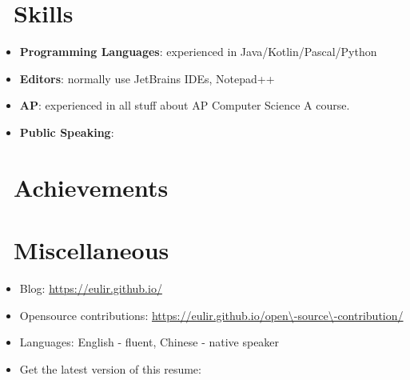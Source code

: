 \documentclass{resume}
\begin{document}
\section{\faCogs\ Skills}
\begin{itemize}[parsep=0.5ex]
  \item \textbf{Programming Languages}:
    experienced in Java/Kotlin/Pascal/Python
  \item \textbf{Editors}:
    normally use JetBrains IDEs, Notepad++
  \item \textbf{AP}:
    experienced in all stuff about AP Computer Science A course.
  \item \textbf{Public Speaking}:
\end{itemize}

\section{\faHeartO\ Achievements}

\section{\faInfo\ Miscellaneous}
\begin{itemize}[parsep=0.5ex]
  \item Blog: \url{https://eulir.github.io/}
  \item Opensource contributions: \url{https://eulir.github.io/open\-source\-contribution/} \\
  \item Languages: English - fluent, Chinese - native speaker
  \item Get the latest version of this resume: %
\end{itemize}
\end{document}
